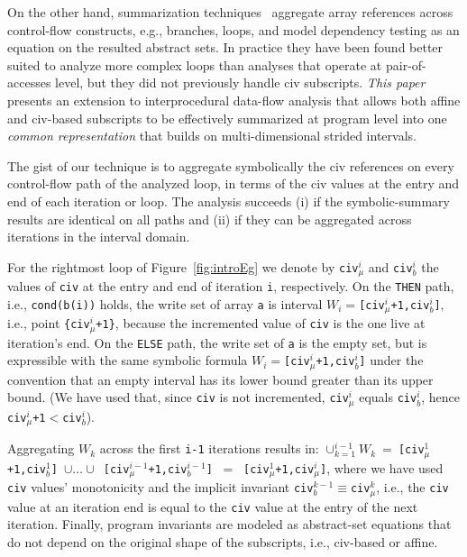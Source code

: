 \documentclass{sig-alternate}
\begin{document}
On the other hand, summarization techniques~\cite{SUIF,LMAD,CosPLDI} aggregate 
array references across control-flow constructs, e.g., branches, loops, and  
model dependency testing as an equation on the resulted abstract sets. 
In practice they have been found better suited to analyze more complex loops 
than analyses that operate at pair-of-accesses level, but they 
did not previously handle {\sc civ} subscripts.   
%
{\em This paper} presents an extension to interprocedural 
data-flow analysis that allows both affine and {\sc civ}-based subscripts 
to be effectively summarized at program level into one {\em common representation} that builds on multi-dimensional strided intervals. 

The gist of our technique is to aggregate symbolically the {\sc civ} 
references on every control-flow path of the analyzed loop, in terms
of the {\sc civ} values at the entry and end of each iteration or loop.
The analysis succeeds (i) if the symbolic-summary results are identical 
on all paths and (ii) if they can be aggregated across iterations %
in the interval domain. %

For the rightmost loop of Figure~\ref{fig:introEg} we denote by 
{\tt civ$_\mu^i$} and {\tt civ$_b^i$} the values of {\tt civ} 
at the entry and end of iteration {\tt i}, respectively.
%
On the {\tt THEN} path, i.e., {\tt cond(b(i))} holds, the write set 
of array {\tt a} is interval $W_i=${\tt [civ$_\mu^i$+1,civ$_b^i$]}, 
i.e., point {\tt \{civ$_\mu^i$+1\}}, because the incremented value 
of {\tt civ} is the one live at iteration's end. 
%
On the {\tt ELSE} path, the write set of {\tt a} is the empty set, 
but is expressible with the same symbolic formula 
$W_i=${\tt [civ$_\mu^i$+1,civ$_b^i$]} under the convention 
that an empty interval has its lower bound greater than its upper bound. 
(We have used that, since {\tt civ} is not incremented, {\tt civ$_\mu^i$} 
equals {\tt civ$_b^i$}, hence {\tt civ$_\mu^i$+1$ < $civ$_b^i$}).

Aggregating $W_k$ across the first {\tt i-1} iterations results in:
$\cup_{k=1}^{i-1}W_k \ = \ ${\tt [civ$_\mu^1$+1,civ$_b^1$]~$\cup\ldots\cup$~[civ$_\mu^{i-1}$+1,civ$_b^{i-1}$]} $\ = \ $ {\tt [civ$_\mu^1$+1,civ$_\mu^i$]}, where we have used {\tt civ} values'
monotonicity and the implicit invariant {\tt civ$_b^{k-1}\equiv$civ$_\mu^{k}$},
i.e., the {\tt civ} value at an iteration end is equal to the {\tt civ}
value at the entry of the next iteration. 
%
%
Finally, program invariants are modeled as abstract-set equations
that do not depend on the original shape of the subscripts, i.e., 
{\sc civ}-based or affine. 
\end{document}
